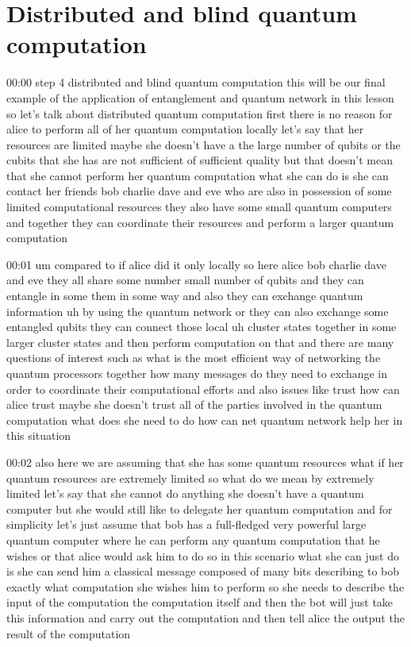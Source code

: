 \section{Distributed and blind quantum computation}


00:00
step 4 distributed and blind quantum computation
this will be our final example of the application of entanglement
and quantum network in this lesson so let's talk about distributed quantum
computation first there is no reason for alice to perform
all of her quantum computation locally let's say that her resources are limited
maybe she doesn't have a the large number of qubits or the cubits that she has
are not sufficient of sufficient quality but that doesn't mean that she cannot
perform her quantum computation what she can do is she can contact her
friends bob charlie dave and eve who are also in possession of some
limited computational resources they also have some small
quantum computers and together they can coordinate
their resources and perform a larger quantum computation

00:01
um compared to if alice did it only locally
so here alice bob charlie dave and eve they all share some number small number
of qubits and they can entangle in some them in
some way and also they can exchange quantum information
uh by using the quantum network or they can also exchange some entangled qubits
they can connect those local uh cluster states
together in some larger cluster states and then perform computation on that and
there are many questions of interest such as what is the most efficient way
of networking the quantum processors together how many messages do they need to
exchange in order to coordinate their computational efforts
and also issues like trust how can alice trust maybe she doesn't trust
all of the parties involved in the quantum computation what does she need
to do how can net quantum network help her in this situation

00:02
also here we are assuming that she has some quantum
resources what if her quantum resources are extremely limited
so what do we mean by extremely limited let's say that she cannot do anything
she doesn't have a quantum computer but she would still like to delegate her
quantum computation and for simplicity let's just assume
that bob has a full-fledged very powerful large quantum computer where he can
perform any quantum computation that he wishes or that alice would ask him to do
so in this scenario what she can just do is she can send him
a classical message composed of many bits describing to bob
exactly what computation she wishes him to perform
so she needs to describe the input of the computation
the computation itself and then the bot will
just take this information and carry out the computation and then
tell alice the output the result of the computation

